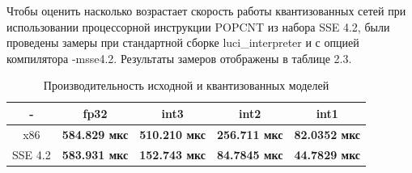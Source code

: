 Чтобы оценить насколько возрастает скорость работы квантизованных сетей при использовании процессорной инструкции POPCNT из набора SSE 4.2, были проведены замеры при стандартной сборке luci\_interpreter и с опцией компилятора -msse4.2. Результаты замеров отображены в таблице 2.3.

\begin{table}[H]
\caption{Производительность исходной и квантизованных моделей}
\begin{center}
\begin{tabular}{|c|c|c|c|c|}
\hline
 -  & fp32 & int3 & int2 & int1 \\
\hline
x86 & \textbf{584.829 мкс} & \textbf{510.210 мкс} & \textbf{256.711 мкс} & \textbf{82.0352 мкс} \\
\hline
SSE 4.2 & \textbf{583.931 мкс} & \textbf{152.743 мкс} & \textbf{84.7845 мкс} & \textbf{44.7829 мкс} \\
\hline
\end{tabular}
\end{center}
\end{table}
